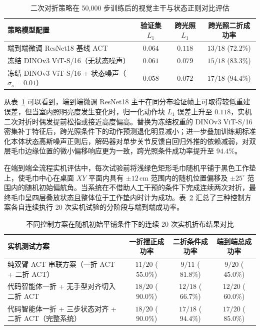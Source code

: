 \begin{table}[htbp]
\centering
\caption{二次对折策略在 50,000 步训练后的视觉主干与状态正则对比评估}
\label{tab:dinov3-ablation}
\footnotesize
\setlength{\tabcolsep}{4pt}
\begin{tabular}{@{}lccc@{}}
  \toprule
  策略模型配置 & 验证集 $L_1$ & 跨光照 $L_1$ & 跨光照二折成功率 \\
  \midrule
  端到端微调 ResNet18 基线 ACT & $0.064$ & $0.118$ & $13 / 18$ ($72.2\%$) \\
  冻结 DINOv3 ViT-S/16（无状态噪声） & $0.061$ & $0.079$ & $15 / 18$ ($83.3\%$) \\
  冻结 DINOv3 ViT-S/16 + 状态噪声（$\sigma_s=0.01$） & $0.058$ & $0.072$ & $17 / 18$ ($94.4\%$) \\
  \bottomrule
\end{tabular}
\end{table}

从表~\ref{tab:dinov3-ablation} 可以看到，端到端微调 ResNet18 主干在同分布验证帧上可取得较低重建误差，但当室内照明亮度发生变化时，归一化动作块 $L_1$ 误差上升至 $0.118$，实机二次对折时偶发提前松指或接近高度偏高。替换为冻结权重的 DINOv3 ViT-S/16 密集补丁特征后，跨光照条件下的动作预测退化明显减小；进一步叠加训练期标准化本体状态高斯噪声正则后，解码器对单步关节反馈自回归外推的依赖减弱，对双层毛巾边缘位置的微小偏移响应更为一致，跨光照条件成功率提升至 $94.4\%$。

在端到端全流程实机评估中，每次试验前将浅绿色矩形毛巾随机平铺于黑色工作垫上，使毛巾中心在桌面 $XY$ 平面内具有 $\pm 12\,\mathrm{cm}$ 范围内的随机位置偏移及 $\pm 25^{\circ}$ 范围内的随机初始偏航角。当系统在不借助人工干预的条件下完成连续两次对折，最终毛巾呈四层叠放状态且整体位于工作垫内时计为成功。表~\ref{tab:e2e-results} 汇总了三种控制方案各自连续执行 20 次实机试验的分阶段与端到端成功率。

\begin{table}[htbp]
\centering
\caption{不同控制方案在随机初始平铺条件下的连续 20 次实机折布结果对比}
\label{tab:e2e-results}
\footnotesize
\setlength{\tabcolsep}{3.5pt}
\begin{tabular}{@{}lccc@{}}
  \toprule
  实机测试方案 & 一折摆正成功率 & 二折条件成功率 & 端到端总成功率 \\
  \midrule
  纯双臂 ACT 串联方案（一折 ACT + 二折 ACT） & $11 / 20$ ($55.0\%$) & $9 / 11$ ($81.8\%$) & $9 / 20$ ($45.0\%$) \\
  代码智能体一折 + 无手型对齐切入二折 ACT & $18 / 20$ ($90.0\%$) & $12 / 18$ ($66.7\%$) & $12 / 20$ ($60.0\%$) \\
  代码智能体一折 + 三步状态对齐 + 二折 ACT（完整系统） & $18 / 20$ ($90.0\%$) & $17 / 18$ ($94.4\%$) & $17 / 20$ ($85.0\%$) \\
  \bottomrule
\end{tabular}
\end{table}

